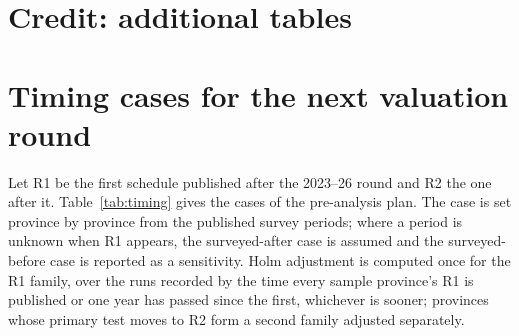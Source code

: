 \begin{table}[h]
\centering\footnotesize
\caption{Breaking point over the recovery haircut and the damage share, $\delta = 4.6\%$}\label{tab:lambdagrid}

\end{table}

\section{Credit: additional tables}\label{app:credit}

\begin{table}[h]
\centering\footnotesize
\caption{Drift of the provincial distribution of commercial-bank loans}\label{tab:drift}

\end{table}

\begin{table}[h]
\centering\footnotesize
\caption{Sample sizes for an equivalence test on the 2011 event}\label{tab:rq2equiv}

\end{table}

\section{Timing cases for the next valuation round}\label{app:timing}

Let R1 be the first schedule published after the 2023--26 round and R2 the one after it. Table~\ref{tab:timing} gives the cases of the pre-analysis plan. The case is set province by province from the published survey periods; where a period is unknown when R1 appears, the surveyed-after case is assumed and the surveyed-before case is reported as a sensitivity. Holm adjustment is computed once for the R1 family, over the runs recorded by the time every sample province's R1 is published or one year has passed since the first, whichever is sooner; provinces whose primary test moves to R2 form a second family adjusted separately.

